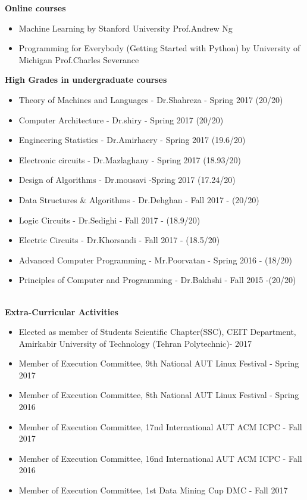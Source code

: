 \documentclass[a4paper,12pt,final]{memoir}
\newcommand{\Sep}{\vspace{1.5em}}
\newcommand{\SmallSep}{\vspace{0.5em}}
\newcommand{\CVSection}[1]
	{\Large\textbf{#1}\par
	\SmallSep\normalsize\normalfont}
\begin{document}
\CVSection{Online courses}
	\begin{itemize}
		\item  Machine Learning by Stanford University Prof.Andrew Ng
		\item Programming for Everybody (Getting Started with Python) by University of Michigan Prof.Charles Severance
		
	\end{itemize}

\Sep


\CVSection{High Grades in undergraduate courses}
	\begin{itemize}
		\item  Theory of Machines and Languages - Dr.Shahreza - Spring 2017 (20/20)
		\item Computer Architecture - Dr.shiry - Spring 2017 (20/20)
		\item Engineering Statistics - Dr.Amirhaery - Spring 2017 (19.6/20)
		\item  Electronic circuits - Dr.Mazlaghany - Spring 2017 (18.93/20)
		\item Design of Algorithms - Dr.mousavi -Spring 2017 (17.24/20)
		\item Data Structures \& Algorithms - Dr.Dehghan - Fall 2017 - (20/20)
		\item Logic Circuits - Dr.Sedighi - Fall 2017 - (18.9/20)
		

		\item Electric Circuits - Dr.Khorsandi - Fall 2017 - (18.5/20)	
		
		\item Advanced Computer Programming - Mr.Poorvatan - Spring 2016 - (18/20)
		\item Principles of Computer and Programming - Dr.Bakhshi - Fall 2015 -(20/20)
		
	\end{itemize}

\normalsize\normalfont
\framebreak
\framebreak
\\

\Sep
\CVSection{Extra-Curricular Activities}
	\begin{itemize}
		\item Elected as member of Students Scientific Chapter(SSC), CEIT Department, Amirkabir University of Technology (Tehran Polytechnic)- 2017
		\item Member of Execution Committee, 9th National AUT Linux Festival - Spring 2017
		\item Member of Execution Committee, 8th National AUT Linux Festival - Spring 2016
		\item Member of Execution Committee, 17nd International AUT ACM ICPC - Fall 2017
		\item Member of Execution Committee, 16nd International AUT ACM ICPC - Fall 2016
		\item Member of Execution Committee, 1st Data Mining Cup DMC - Fall 2017
		
	\end{itemize}
\end{document}
